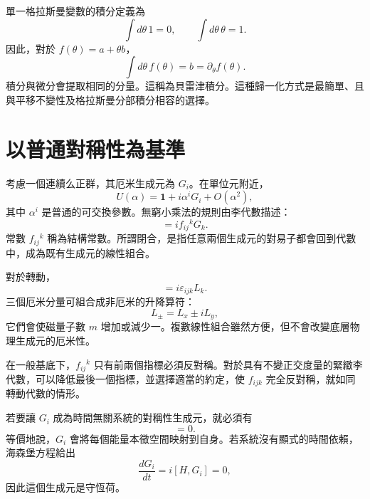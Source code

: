 單一格拉斯曼變數的積分定義為
\begin{equation}
\int d\theta\,1=0,
\qquad
\int d\theta\,\theta=1.
\end{equation}
因此，對於 \(f(\theta)=a+\theta b\)，
\begin{equation}
\int d\theta\,f(\theta)=b=\partial_\theta f(\theta).
\end{equation}
積分與微分會提取相同的分量。這稱為貝雷津積分。這種歸一化方式是最簡單、且與平移不變性及格拉斯曼分部積分相容的選擇。

\section{以普通對稱性為基準}

考慮一個連續么正群，其厄米生成元為 \(G_i\)。在單位元附近，
\begin{equation}
U(\alpha)=\mathbf 1+i\alpha^iG_i+O(\alpha^2),
\end{equation}
其中 \(\alpha^i\) 是普通的可交換參數。無窮小乘法的規則由李代數描述：
\begin{equation}
[G_i,G_j]=i f_{ij}{}^{k}G_k.
\end{equation}
常數 \(f_{ij}{}^k\) 稱為結構常數。所謂閉合，是指任意兩個生成元的對易子都會回到代數中，成為既有生成元的線性組合。

對於轉動，
\begin{equation}
[L_i,L_j]=i\varepsilon_{ijk}L_k.
\end{equation}
三個厄米分量可組合成非厄米的升降算符：
\begin{equation}
L_\pm=L_x\pm iL_y,
\end{equation}
它們會使磁量子數 \(m\) 增加或減少一。複數線性組合雖然方便，但不會改變底層物理生成元的厄米性。

在一般基底下，\(f_{ij}{}^k\) 只有前兩個指標必須反對稱。對於具有不變正交度量的緊緻李代數，可以降低最後一個指標，並選擇適當的約定，使 \(f_{ijk}\) 完全反對稱，就如同轉動代數的情形。

若要讓 \(G_i\) 成為時間無關系統的對稱性生成元，就必須有
\begin{equation}
[H,G_i]=0.
\end{equation}
等價地說，\(G_i\) 會將每個能量本徵空間映射到自身。若系統沒有顯式的時間依賴，海森堡方程給出
\begin{equation}
\frac{dG_i}{dt}=i[H,G_i]=0,
\end{equation}
因此這個生成元是守恆荷。

